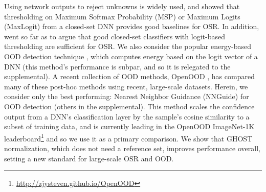 Using network outputs to reject unknowns is widely used, and \citet{hendrycks17baseline,hendrycks2022scaling} showed that thresholding on Maximum  Softmax Probability (MSP) or Maximum Logits (MaxLogit) from a closed-set DNN provides good baselines for OSR. 
In addition, \citet{vaze2022openset} went so far as to argue that good closed-set classifiers with logit-based thresholding are sufficient for OSR. 
We also consider the popular energy-based OOD detection technique \cite{liu2020energy}, which computes energy based on the logit vector of a DNN (this method's performance is subpar, and so it is relegated to the supplemental). 
A recent collection of OOD methods, OpenOOD \cite{yang2022openood,zhang2023openood}, has compared many of these post-hoc methods using recent, large-scale datasets.
Herein, we consider only the best performing: Nearest Neighbor Guidance (NNGuide) \cite{park2023nearest} for OOD detection (others in the supplemental).
This method scales the confidence output from a DNN's classification layer by the sample's cosine similarity to a subset of training data, and is currently leading in the OpenOOD ImageNet-1K leaderboard\footnote{\url{http://zjysteven.github.io/OpenOOD}} and so we use it as a primary comparison.
We show that GHOST normalization, which does not need a reference set, improves performance overall, setting a new standard for large-scale OSR and OOD. 



